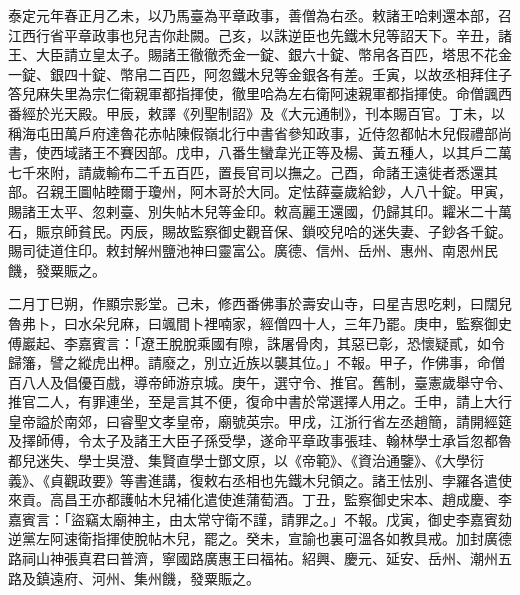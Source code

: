 \begin{pinyinscope}
 泰定元年春正月乙未，以乃馬臺為平章政事，善僧為右丞。敕諸王哈剌還本部，召江西行省平章政事也兒吉你赴闕。己亥，以誅逆臣也先鐵木兒等詔天下。辛丑，諸王、大臣請立皇太子。賜諸王徹徹禿金一錠、銀六十錠、幣帛各百匹，塔思不花金一錠、銀四十錠、幣帛二百匹，阿忽鐵木兒等金銀各有差。壬寅，以故丞相拜住子答兒麻失里為宗仁衛親軍都指揮使，徹里哈為左右衛阿速親軍都指揮使。命僧諷西番經於光天殿。甲辰，敕譯《列聖制詔》及《大元通制》，刊本賜百官。丁未，以稱海屯田萬戶府達魯花赤帖陳假嶺北行中書省參知政事，近侍忽都帖木兒假禮部尚書，使西域諸王不賽因部。戊申，八番生蠻韋光正等及楊、黃五種人，以其戶二萬七千來附，請歲輸布二千五百匹，置長官司以撫之。己酉，命諸王遠徙者悉還其部。召親王圖帖睦爾于瓊州，阿木哥於大同。定怯薛臺歲給鈔，人八十錠。甲寅，賜諸王太平、忽剌臺、別失帖木兒等金印。敕高麗王還國，仍歸其印。糶米二十萬石，賑京師貧民。丙辰，賜故監察御史觀音保、鎖咬兒哈的迷失妻、子鈔各千錠。賜司徒道住印。敕封解州鹽池神曰靈富公。廣德、信州、岳州、惠州、南恩州民饑，發粟賑之。



 二月丁巳朔，作顯宗影堂。己未，修西番佛事於壽安山寺，曰星吉思吃剌，曰闊兒魯弗卜，曰水朵兒麻，曰颯間卜裡喃家，經僧四十人，三年乃罷。庚申，監察御史傅巖起、李嘉賓言：「遼王脫脫乘國有隙，誅屠骨肉，其惡已彰，恐懷疑貳，如令歸籓，譬之縱虎出柙。請廢之，別立近族以襲其位。」不報。甲子，作佛事，命僧百八人及倡優百戲，導帝師游京城。庚午，選守令、推官。舊制，臺憲歲舉守令、推官二人，有罪連坐，至是言其不便，復命中書於常選擇人用之。壬申，請上大行皇帝謚於南郊，曰睿聖文孝皇帝，廟號英宗。甲戌，江浙行省左丞趙簡，請開經筵及擇師傅，令太子及諸王大臣子孫受學，遂命平章政事張珪、翰林學士承旨忽都魯都兒迷失、學士吳澄、集賢直學士鄧文原，以《帝範》、《資治通鑒》、《大學衍義》、《貞觀政要》等書進講，復敕右丞相也先鐵木兒領之。諸王怯別、孛羅各遣使來貢。高昌王亦都護帖木兒補化遣使進蒲萄酒。丁丑，監察御史宋本、趙成慶、李嘉賓言：「盜竊太廟神主，由太常守衛不謹，請罪之。」不報。戊寅，御史李嘉賓劾逆黨左阿速衛指揮使脫帖木兒，罷之。癸未，宣諭也裏可溫各如教具戒。加封廣德路祠山神張真君曰普濟，寧國路廣惠王曰福祐。紹興、慶元、延安、岳州、潮州五路及鎮遠府、河州、集州饑，發粟賑之。




\end{pinyinscope}
